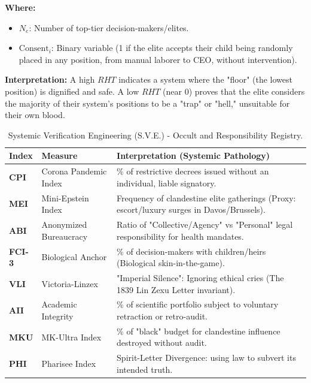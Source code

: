 \documentclass[11pt,a4paper]{article}
\theoremstyle{definition}
\theoremstyle{remark}
\begin{document}
\textbf{Where:}
\begin{itemize}
    \item $N_{e}$: Number of top-tier decision-makers/elites.
    \item $\text{Consent}_i$: Binary variable (1 if the elite accepts their child being randomly placed in any position, from manual laborer to CEO, without intervention).
\end{itemize}

\textbf{Interpretation:}
A high $RHT$ indicates a system where the "floor" (the lowest position) is dignified and safe. A low $RHT$ (near 0) proves that the elite considers the majority of their system's positions to be a "trap" or "hell," unsuitable for their own blood.

\begin{table}[h!]
\centering
\small
\begin{tabular}{|l|l|l|}
\hline
\textbf{Index} & \textbf{Measure} & \textbf{Interpretation (Systemic Pathology)} \\ \hline
\textbf{CPI} & Corona Pandemic Index & \% of restrictive decrees issued without an individual, liable signatory. \\ \hline
\textbf{MEI} & Mini-Epstein Index & Frequency of clandestine elite gatherings (Proxy: escort/luxury surges in Davos/Brussels). \\ \hline
\textbf{ABI} & Anonymized Bureaucracy & Ratio of "Collective/Agency" vs "Personal" legal responsibility for health mandates. \\ \hline
\textbf{FCI-3} & Biological Anchor & \% of decision-makers with children/heirs (Biological skin-in-the-game). \\ \hline
\textbf{VLI} & Victoria-Linzex & "Imperial Silence": Ignoring ethical cries (The 1839 Lin Zexu Letter invariant). \\ \hline
\textbf{AII} & Academic Integrity & \% of scientific portfolio subject to voluntary retraction or retro-audit. \\ \hline
\textbf{MKU} & MK-Ultra Index & \% of "black" budget for clandestine influence destroyed without audit. \\ \hline
\textbf{PHI} & Pharisee Index & Spirit-Letter Divergence: using law to subvert its intended truth. \\ \hline
\end{tabular}
\caption{Systemic Verification Engineering (S.V.E.) - Occult and Responsibility Registry.}
\end{table}
\end{document}
